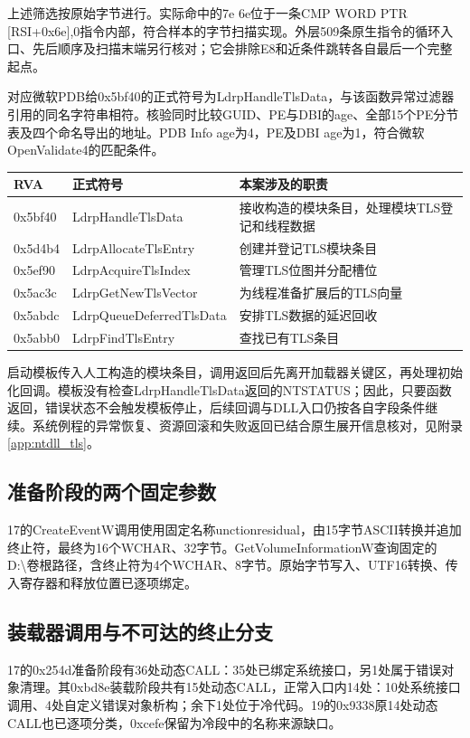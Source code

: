 \documentclass[UTF8,a4paper,zihao=5,fontset=windows]{ctexart}
\newcommand{\code}[1]{{\ttfamily\small #1}}
\begin{document}
上述筛选按原始字节进行。实际命中的\code{7e 6e}位于一条\code{CMP WORD PTR [RSI+0x6e],0}指令内部，符合样本的字节扫描实现。外层509条原生指令的循环入口、先后顺序及扫描末端另行核对；它会排除E8和近条件跳转各自最后一个完整起点。

对应微软PDB给\code{0x5bf40}的正式符号为\code{LdrpHandleTlsData}，与该函数异常过滤器引用的同名字符串相符。核验同时比较GUID、PE与DBI的age、全部15个PE分节表及四个命名导出的地址。PDB Info age为4，PE及DBI age为1，符合微软\code{OpenValidate4}的匹配条件。\cite{mspdbmatching}

\begin{longtable}{@{}L{33mm}L{59mm}L{58mm}@{}}\toprule RVA & 正式符号 & 本案涉及的职责\\\midrule\endhead
\code{0x5bf40} & \code{LdrpHandleTlsData} & 接收构造的模块条目，处理模块TLS登记和线程数据\\
\code{0x5d4b4} & \code{LdrpAllocateTlsEntry} & 创建并登记TLS模块条目\\
\code{0x5ef90} & \code{LdrpAcquireTlsIndex} & 管理TLS位图并分配槽位\\
\code{0x5ac3c} & \code{LdrpGetNewTlsVector} & 为线程准备扩展后的TLS向量\\
\code{0x5abdc} & \code{LdrpQueueDeferredTlsData} & 安排TLS数据的延迟回收\\
\code{0x5abb0} & \code{LdrpFindTlsEntry} & 查找已有TLS条目\\\bottomrule\end{longtable}

启动模板传入人工构造的模块条目，调用返回后先离开加载器关键区，再处理初始化回调。模板没有检查\code{LdrpHandleTlsData}返回的\code{NTSTATUS}；因此，只要函数返回，错误状态不会触发模板停止，后续回调与DLL入口仍按各自字段条件继续。系统例程的异常恢复、资源回滚和失败返回已结合原生展开信息核对，见附录\ref{app:ntdll_tls}。

\subsection{准备阶段的两个固定参数}
17的\code{CreateEventW}调用使用固定名称\code{unctionresidual}，由15字节ASCII转换并追加终止符，最终为16个WCHAR、32字节。\code{GetVolumeInformationW}查询固定的\code{D:\textbackslash}卷根路径，含终止符为4个WCHAR、8字节。原始字节写入、UTF16转换、传入寄存器和释放位置已逐项绑定。

\subsection{装载器调用与不可达的终止分支}
17的\code{0x254d}准备阶段有36处动态CALL：35处已绑定系统接口，另1处属于错误对象清理。其\code{0xbd8e}装载阶段共有15处动态CALL，正常入口内14处：10处系统接口调用、4处自定义错误对象析构；余下1处位于冷代码。19的\code{0x9338}原14处动态CALL也已逐项分类，\code{0xcefe}保留为冷段中的名称来源缺口。
\end{document}
